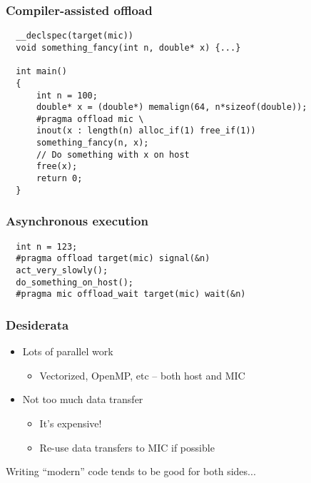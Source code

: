 \documentclass{beamer}
\begin{document}
\begin{frame}[fragile]
  \frametitle{Compiler-assisted offload}

\begin{lstlisting}
  __declspec(target(mic))
  void something_fancy(int n, double* x) {...}
  
  int main()
  {
      int n = 100;
      double* x = (double*) memalign(64, n*sizeof(double));
      #pragma offload mic \
      inout(x : length(n) alloc_if(1) free_if(1))
      something_fancy(n, x);
      // Do something with x on host
      free(x);
      return 0;
  }
\end{lstlisting}  
\end{frame}


\begin{frame}[fragile]
  \frametitle{Asynchronous execution}

\begin{lstlisting}
  int n = 123;
  #pragma offload target(mic) signal(&n)
  act_very_slowly();
  do_something_on_host();
  #pragma mic offload_wait target(mic) wait(&n)
\end{lstlisting}  
\end{frame}


\begin{frame}
  \frametitle{Desiderata}

  \begin{itemize}
  \item Lots of parallel work
    \begin{itemize}
    \item Vectorized, OpenMP, etc -- both host and MIC
    \end{itemize}
  \item Not too much data transfer
    \begin{itemize}
    \item It's expensive!
    \item Re-use data transfers to MIC if possible
    \end{itemize}
  \end{itemize}
  Writing ``modern'' code tends to be good for both sides...
\end{frame}
\end{document}
